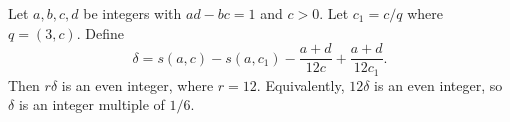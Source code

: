 Let $a, b, c, d$ be integers with $ad - bc = 1$ and $c > 0$. Let $c_1 = c / q$ where $q = (3, c)$. Define
$$\delta = s(a, c) - s(a, c_1) - \frac{a + d}{12c} + \frac{a + d}{12c_1}.$$
Then $r\delta$ is an even integer, where $r = 12$. Equivalently, $12\delta$ is an even integer, so $\delta$ is an integer multiple of $1/6$.
